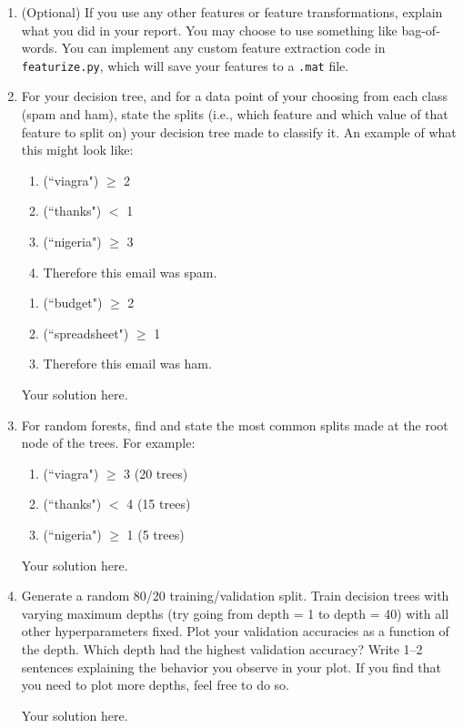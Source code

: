 \begin{enumerate}
	\item (Optional) If you use any other features or feature transformations, explain what you did in your report. You may choose to use something like bag-of-words. You can implement any custom feature extraction code in \verb+featurize.py+, which will save your features to a \verb+.mat+ file.

	\item For your decision tree, and for a data point of your choosing from each class (spam and ham), state the splits (i.e., which feature and which value of that feature to split on) your decision tree made to classify it. An example of what this might look like:
	\begin{enumerate}
		\item (``viagra") $\geq$ 2
		\item (``thanks") $<$ 1
		\item (``nigeria") $\geq$ 3
		\item Therefore this email was spam.
	\end{enumerate}

	\begin{enumerate}
		\item (``budget") $\geq$ 2
		\item (``spreadsheet") $\geq$ 1
		\item Therefore this email was ham.
	\end{enumerate}
	
    \begin{solution}
    Your solution here.
    \end{solution}
    
    \item For random forests, find and state the most common splits made at the root node of the trees. For example:
	\begin{enumerate}
		\item (``viagra") $\geq$ 3 (20 trees)
		\item (``thanks") $<$ 4 (15 trees)
		\item (``nigeria") $\geq$ 1 (5 trees)
	\end{enumerate}



	\begin{solution}
        Your solution here.
	\end{solution}
	
	\item Generate a random 80/20 training/validation split. Train decision trees with varying maximum depths (try going from depth = 1 to depth = 40) with all other hyperparameters fixed. Plot your validation accuracies as a function of the depth. Which depth had the highest validation accuracy? Write 1--2 sentences explaining the behavior you observe in your plot. If you find that you need to plot more depths, feel free to do so.
 
        \begin{solution}
        Your solution here.
        \end{solution}
\end{enumerate}

